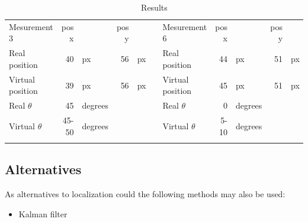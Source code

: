 \begin{table}[H]
\begin{tabular}{|lrlrll|lrlrl|}
\rowcolor[HTML]{9B9B9B} 
Mesurement 3            & pos x &         & pos y &    &  & Mesurement 6            & pos x   &         & pos y &    \\
Real position           & 40    & px      & 56    & px &  & Real position           & 44      & px      & 51    & px \\
Virtual position        & 39    & px      & 56    & px &  & Virtual position        & 45      & px      & 51    & px \\
Real $\theta$    & 45    & degrees &       &    &  & Real $\theta$    & 0       & degrees &       &    \\
Virtual $\theta$ & 45-50 & degrees &       &    &  & Virtual $\theta$ & 5-10    & degrees &       &   \\ 
 &  &  &       &    &  &  &    &  &       &   \\ \hline
\end{tabular}
\caption{Results}
\label{tab::results}
\end{table}

\subsection{Alternatives}
As alternatives to localization could the following methods may also be used:
\begin{itemize}\itemsep-2pt
\item Kalman filter
\end{itemize}

